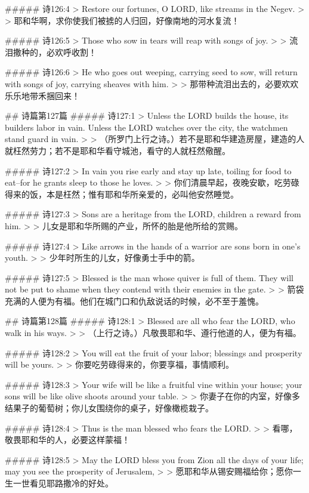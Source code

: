 ##### 诗126:4
> Restore our fortunes, O LORD, like streams in the Negev.
>
> 耶和华啊，求你使我们被掳的人归回，好像南地的河水复流！


##### 诗126:5
> Those who sow in tears will reap with songs of joy.
>
> 流泪撒种的，必欢呼收割！


##### 诗126:6
> He who goes out weeping, carrying seed to sow, will return with songs of joy, carrying sheaves with him.
>
> 那带种流泪出去的，必要欢欢乐乐地带禾捆回来！


## 诗篇第127篇
##### 诗127:1
> Unless the LORD builds the house, its builders labor in vain. Unless the LORD watches over the city, the watchmen stand guard in vain.
>
> （所罗门上行之诗。）若不是耶和华建造房屋，建造的人就枉然劳力；若不是耶和华看守城池，看守的人就枉然儆醒。


##### 诗127:2
> In vain you rise early and stay up late, toiling for food to eat--for he grants sleep to those he loves.
>
> 你们清晨早起，夜晚安歇，吃劳碌得来的饭，本是枉然；惟有耶和华所亲爱的，必叫他安然睡觉。


##### 诗127:3
> Sons are a heritage from the LORD, children a reward from him.
>
> 儿女是耶和华所赐的产业，所怀的胎是他所给的赏赐。


##### 诗127:4
> Like arrows in the hands of a warrior are sons born in one's youth.
>
> 少年时所生的儿女，好像勇士手中的箭。


##### 诗127:5
> Blessed is the man whose quiver is full of them. They will not be put to shame when they contend with their enemies in the gate.
>
> 箭袋充满的人便为有福。他们在城门口和仇敌说话的时候，必不至于羞愧。


## 诗篇第128篇
##### 诗128:1
> Blessed are all who fear the LORD, who walk in his ways.
>
> （上行之诗。）凡敬畏耶和华、遵行他道的人，便为有福。


##### 诗128:2
> You will eat the fruit of your labor; blessings and prosperity will be yours.
>
> 你要吃劳碌得来的，你要享福，事情顺利。


##### 诗128:3
> Your wife will be like a fruitful vine within your house; your sons will be like olive shoots around your table.
>
> 你妻子在你的内室，好像多结果子的葡萄树；你儿女围绕你的桌子，好像橄榄栽子。


##### 诗128:4
> Thus is the man blessed who fears the LORD.
>
> 看哪，敬畏耶和华的人，必要这样蒙福！


##### 诗128:5
> May the LORD bless you from Zion all the days of your life; may you see the prosperity of Jerusalem,
>
> 愿耶和华从锡安赐福给你；愿你一生一世看见耶路撒冷的好处。


